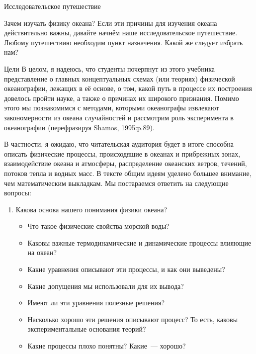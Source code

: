\begin{chapter}{Исследовательское путешествие}
\begin{section}{Зачем изучать физику океана?}
Если эти причины для изучения океана действительно важны, давайте начнём 
наше исследовательское путешествие. Любому путешествию необходим пункт 
назначения. Какой же следует избрать нам?
\end{section}

\begin{section}{Цели}
В целом, я надеюсь, что студенты почерпнут из этого учебника
представление о главных концептуальных схемах (или теориях) физической 
океанографии, лежащих в её основе, о том, какой путь в процессе их построения 
довелось пройти науке, а также о причинах их широкого признания. Помимо этого 
мы познакомимся с методами, которыми океанографы извлекают закономерности из
океана случайностей и рассмотрим роль эксперимента в океанографии
(перефразируя Shamos, 1995:p.89).

В частности, я ожидаю, что читательская аудитория будет в итоге способна 
описать физические процессы, происходящие в океанах и прибрежных зонах, 
взаимодействие океана и атмосферы, распределение океанских ветров, течений, 
потоков тепла и водных масс. В тексте общим идеям уделено большее внимание, 
чем математическим выкладкам. Мы постараемся ответить на следующие вопросы:

\begin{enumerate}
\item
Какова основа нашего понимания физики океана?

\begin{itemize}
  \item
  Что такое физические свойства морской воды? 

  \item
  Каковы важные термодинамические и динамические процессы влияющие на океан? 

  \item
  Какие уравнения описывают эти процессы, и как они выведены? 

  \item
  Какие допущения мы использовали для их вывода? 

  \item
  Имеют ли эти уравнения полезные решения? 

  \item
  Насколько хорошо эти решения описывают процесс? То есть, каковы 
  экспериментальные основания теорий? 

  \item
  Какие процессы плохо понятны? Какие~--- хорошо?
\end{itemize}


\end{enumerate}
\end{section}
\end{chapter}
